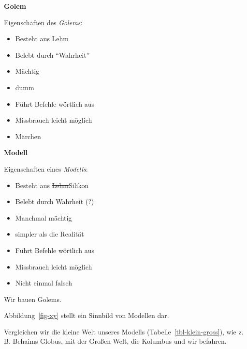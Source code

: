 \documentclass[
  ngerman,
  letterpaper,
  twoside,
  open=any]{scrbook}
\providecommand{\tightlist}{%
  \setlength{\itemsep}{0pt}\setlength{\parskip}{0pt}}\usepackage{longtable,booktabs,array}
\theoremstyle{definition}
\theoremstyle{plain}
\theoremstyle{definition}
\theoremstyle{definition}
\theoremstyle{definition}
\theoremstyle{definition}
\theoremstyle{remark}
\begin{document}
\textbf{Golem}

Eigenschaften des \emph{Golems}:

\begin{itemize}
\tightlist
\item
  Besteht aus Lehm
\item
  Belebt durch \enquote{Wahrheit}
\item
  Mächtig
\item
  dumm
\item
  Führt Befehle wörtlich aus
\item
  Missbrauch leicht möglich
\item
  Märchen
\end{itemize}

\textbf{Modell}

Eigenschaften eines \emph{Modells}:

\begin{itemize}
\tightlist
\item
  Besteht aus \st{Lehm}Silikon
\item
  Belebt durch Wahrheit (?)
\item
  Manchmal mächtig
\item
  simpler als die Realität
\item
  Führt Befehle wörtlich aus
\item
  Missbrauch leicht möglich
\item
  Nicht einmal falsch
\end{itemize}

\begin{tcolorbox}[enhanced jigsaw, arc=.35mm, bottomrule=.15mm, bottomtitle=1mm, breakable, colback=white, colbacktitle=quarto-callout-note-color!10!white, colframe=quarto-callout-note-color-frame, coltitle=black, left=2mm, leftrule=.75mm, opacityback=0, opacitybacktitle=0.6, rightrule=.15mm, title=\textcolor{quarto-callout-note-color}{\faInfo}\hspace{0.5em}{Hinweis}, titlerule=0mm, toprule=.15mm, toptitle=1mm]

Wir bauen Golems.

\end{tcolorbox}

Abbildung~\ref{fig-xy} stellt ein Sinnbild von Modellen dar.

Vergleichen wir die kleine Welt unseres Modells
(Tabelle~\ref{tbl-klein-gross}), wie z.\,B. Behaims Globus, mit der
Großen Welt, die Kolumbus und wir befahren.
\end{document}
